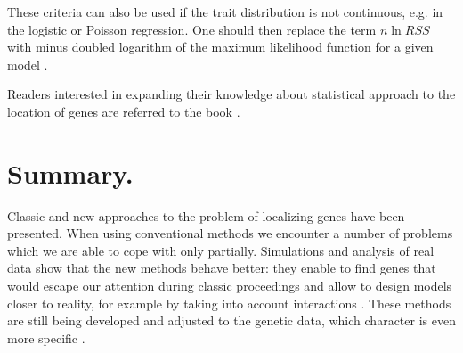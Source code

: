 \documentclass[]{MathAppl18}
\begin{document}
These criteria can also be used if the trait distribution is not continuous, e.g. in the logistic or Poisson regression. One should then replace the term $n\ln RSS$ with minus doubled logarithm of the maximum likelihood function for a given model \cite{ThoBas1996:Loss}.

Readers interested in expanding their knowledge about statistical approach to the location of genes are referred to the book \cite{NormaPN-ISO8258}.

\section{Summary.} Classic and new approaches to the problem of localizing genes have been presented. When using conventional methods we encounter a number of problems which we are able to cope with only partially. Simulations and analysis of real data show that the new methods behave better: they enable to find genes that would escape our attention during classic proceedings \cite{KamPor2009:robust,ThoBas1996:Loss,Var1975:Bayesian} and allow to design models closer to reality, for example by taking into account interactions \cite{FigGom2013:skew-normal}. These methods are still being developed and adjusted to the genetic data, which character is even more specific \cite{FigFig2014:COMPSTAT}.
\end{document}
